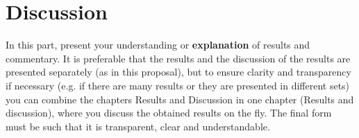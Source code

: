 \chapter{Discussion}\label{cha:discussion}

In this part, present your understanding or \textbf{explanation} of results and commentary. It is preferable that the results and the discussion of the results are presented separately (as in this proposal), but to ensure clarity and transparency if necessary (e.g. if there are many results or they are presented in different sets) you can combine the chapters Results and Discussion in one chapter (Results and discussion), where you discuss the obtained results on the fly. The final form must be such that it is transparent, clear and understandable.
